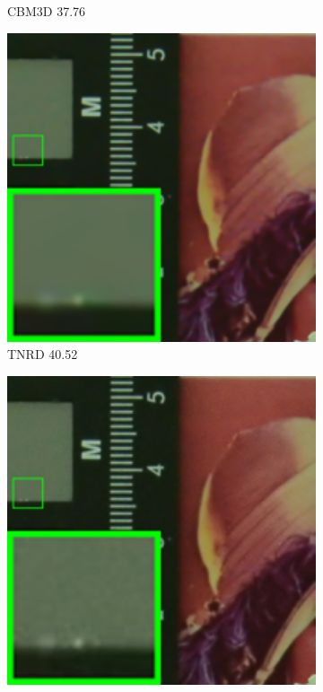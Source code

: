 \begin{figure}
\begin{subfigure}[t]{0.19\textwidth}
		\caption{CBM3D 37.76}
    \end{subfigure}
    \hfill
    \begin{subfigure}[t]{0.19\textwidth}
        \centering
        \includegraphics[width=1\textwidth]{images/mcwnnm/resize_br_TRD_CC15_d800_iso1600_2.png}
\caption{TNRD 40.52}
    \end{subfigure}
    \hfill
    \begin{subfigure}[t]{0.19\textwidth}
        \centering
        \includegraphics[width=1\textwidth]{images/mcwnnm/resize_br_NI_CC15_d800_iso1600_2.png}

\end{subfigure}
\end{figure}
